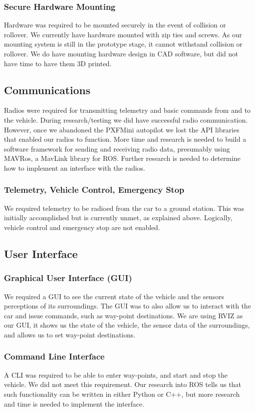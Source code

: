 \documentclass[compsoc,draftclsnofoot,onecolumn,10pt]{IEEEtran}
\begin{document}
\subsubsection{Secure Hardware Mounting}
Hardware was required to be mounted securely in the event of collision or rollover. We currently have hardware mounted with zip ties and screws. As our mounting system is still in the prototype stage, it cannot withstand collision or rollover. We do have mounting hardware design in CAD software, but did not have time to have them 3D printed.

\subsection{Communications}
Radios were required for transmitting telemetry and basic commands from and to the vehicle. During research/testing we did have successful radio communication. However, once we abandoned the PXFMini autopilot we lost the API libraries that enabled our radios to function. More time and research is needed to build a software framework for sending and receiving radio data, presumably using MAVRos, a MavLink library for ROS. Further research is needed to determine how to implement an interface with the radios.

\subsubsection{Telemetry, Vehicle Control, Emergency Stop}
We required telemetry to be radioed from the car to a ground station. This was initially accomplished but is currently unmet, as explained above. Logically, vehicle control and emergency stop are not enabled.


\subsection{User Interface}
\subsubsection{Graphical User Interface (GUI)}
We required a GUI to see the current state of the vehicle and the sensors perceptions of its surroundings. The GUI was to also allow us to interact with the car and issue commands, such as way-point destinations.  We are using RVIZ as our GUI, it shows us the state of the vehicle, the sensor data of the surroundings, and allows us to set way-point destinations.


\subsubsection{Command Line Interface}
A CLI was required to be able to enter way-points, and start and stop the vehicle. We did not meet this requirement. Our research into ROS tells us that such functionality can be written in either Python or C++, but more research and time is needed to implement the interface.
\end{document}
